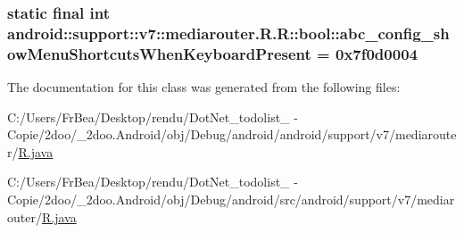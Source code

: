 \hypertarget{classandroid_1_1support_1_1v7_1_1mediarouter_1_1_r_1_1bool_f79fbd77635d57fa69b3160c34015a5d}{
\subsubsection[{abc\_\-config\_\-showMenuShortcutsWhenKeyboardPresent}]{\setlength{\rightskip}{0pt plus 5cm}static final int android::support::v7::mediarouter.R.R::bool::abc\_\-config\_\-showMenuShortcutsWhenKeyboardPresent = 0x7f0d0004}}
\label{classandroid_1_1support_1_1v7_1_1mediarouter_1_1_r_1_1bool_f79fbd77635d57fa69b3160c34015a5d}




The documentation for this class was generated from the following files:\begin{CompactItemize}
\item 
C:/Users/FrBea/Desktop/rendu/DotNet\_\-todolist\_ - Copie/2doo/\_\-2doo.Android/obj/Debug/android/android/support/v7/mediarouter/\hyperlink{android_2support_2v7_2mediarouter_2_r_8java}{R.java}\item 
C:/Users/FrBea/Desktop/rendu/DotNet\_\-todolist\_ - Copie/2doo/\_\-2doo.Android/obj/Debug/android/src/android/support/v7/mediarouter/\hyperlink{src_2android_2support_2v7_2mediarouter_2_r_8java}{R.java}\end{CompactItemize}
